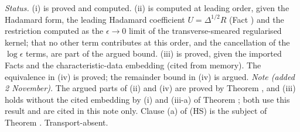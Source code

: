 \emph{Status.} (i) is proved and computed. (ii) is computed at leading order, given the Hadamard form, the leading Hadamard coefficient $U = \Delta^{1/2}R$ (Fact ) and the restriction computed as the $\epsilon \to 0$ limit of the transverse-smeared regularised kernel; that no other term contributes at this order, and the cancellation of the $\log\epsilon$ terms, are part of the argued bound. (iii) is proved, given the imported Facts and the characteristic-data embedding (cited from memory). The equivalence in (iv) is proved; the remainder bound in (iv) is argued. \emph{Note (added 2 November).} The argued parts of (ii) and (iv) are proved by Theorem , and (iii) holds without the cited embedding by (i) and (iii-a) of Theorem ; both use this result and are cited in this note only. Clause (a) of (HS) is the subject of Theorem . Transport-absent.
